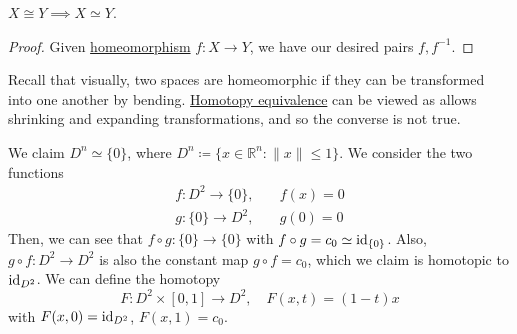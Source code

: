 	\begin{theorem}
	  \label{thm:homoeomorphic-implies-homotopy-equivalent}
		$X \cong Y \implies X \simeq Y$. 
  \end{theorem}
  \begin{proof}
		Given \hyperref[pst-def:homeomorphism]{homeomorphism} $f: X \to Y$, we have our desired pairs $f, f^{-1}$. 
  \end{proof}

  Recall that visually, two spaces are homeomorphic if they can be transformed into one another by bending. \hyperref[def:homotopy-equivalence]{Homotopy equivalence} can be viewed as allows shrinking and expanding transformations, and so the converse is not true. 

	\begin{example}
	  \label{ex:dnsimeq0-but-dnnotcong0}
		We claim $D^n \simeq \{0\}$, where $D^n \coloneqq \{x \in \mathbb{R}^n \colon \|x\| \leq 1 \}$. We consider the two functions 
		\begin{align}
			f: D^2 \to \{0\}, & \quad f(x) = 0 \\ 
			g: \{0\} \to D^2, & \quad g(0) = 0
		\end{align}
		Then, we can see that $f \circ g: \{0\} \to \{0\}$ with $f \circ g = c_0 \simeq \operatorname{id}_{\{0\}}$. Also, $g \circ f: D^2 \to D^2$ is also the constant map $g \circ f = c_0$, which we claim is homotopic to $\operatorname{id}_{D^2}$. We can define the homotopy 
		\begin{equation}
			F: D^2 \times [0, 1] \to D^2, \quad F(x, t) = (1 - t)x
		\end{equation}
		with $F(x, 0) = \operatorname{id}_{D^2}$, $F(x, 1) = c_0$. 
  \end{example}


